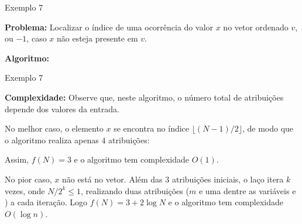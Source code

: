 \begin{frame}[fragile]{Exemplo 7}

	{\bf Problema:} Localizar o índice de uma ocorrência do valor $x$ no vetor ordenado
        $v$, ou $-1$, caso $x$ não esteja presente em $v$.

    {\bf Algoritmo:} 

\end{frame}

\begin{frame}[fragile]{Exemplo 7}

    {\bf Complexidade:} Observe que, neste algoritmo, o número total de atribuições depende
    dos valores da entrada.

    No melhor caso, o elemento $x$ se encontra no índice $\lfloor (N - 1)/2\rfloor$, de modo que
    o algoritmo realiza apenas $4$ atribuições:
    \begin{center} 
    \end{center}

    Assim, $f(N) = 3$ e o algoritmo tem complexidade $O(1)$.

    No pior caso, $x$ não está no vetor. Além das 3 atribuições iniciais, o laço itera $k$ vezes, 
    onde $N/2^k \leq 1$, realizando duas atribuições ($m$ e uma dentre as variáveis  e
    ) a cada iteração. Logo $f(N) = 3 + 2\log N$ e o algoritmo tem complexidade 
    $O(\log n)$.

\end{frame}
